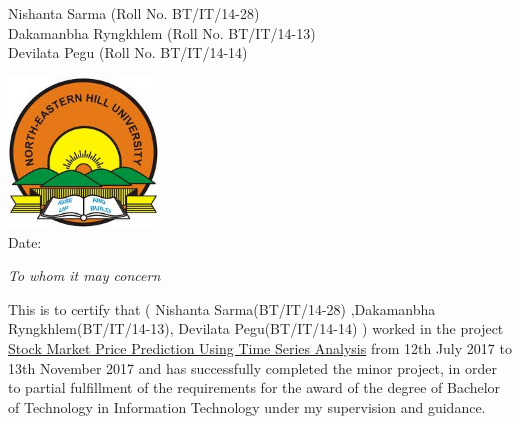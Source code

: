 \documentclass{report}
\begin{document}
\begin{flushright}
Nishanta Sarma (Roll No. BT/IT/14-28)\\
Dakamanbha Ryngkhlem (Roll No. BT/IT/14-13)\\
Devilata Pegu (Roll No. BT/IT/14-14)\\
\end{flushright}




\begin{center}
\vspace{0.6cm}
\includegraphics[width=4cm]{nehulogo.jpg} \\
\hspace{100mm}Date:

\vspace{10mm}\textsl {To whom it may concern}\\[0.5cm]
\end{center}
\vspace{10mm} This is to certify that  ( Nishanta Sarma(BT/IT/14-28) ,Dakamanbha Ryngkhlem(BT/IT/14-13), 
Devilata Pegu(BT/IT/14-14) ) worked in the project \underline{Stock Market Price Prediction }\newline \underline {Using Time Series Analysis} from 12th July 2017 to 13th November 2017 and has successfully completed the minor  project, in order to partial fulfillment of the requirements for the award of the degree of Bachelor of Technology in Information Technology under my supervision and guidance.


\vfill

\newpage
\end{document}
